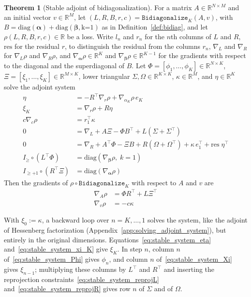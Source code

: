 \documentclass[a4paper,12pt]{article}
\theoremstyle{definition}
\newtheorem{theorem}{Theorem}
\begin{document}
\begin{theorem}[Stable adjoint of bidiagonalization]\label{thm:stable_adjoint}
For a matrix $A \in \mathbb{R}^{N \times M}$ and an initial vector $v \in \mathbb{R}^M$, let $(L, R, B, r, c) = \texttt{Bidiagonalize}_K(A, v)$, with $B = \text{diag}(\boldsymbol{\alpha}) + \text{diag}(\boldsymbol{\beta}, \text{k=1})$ as in Definition~\ref{def:bidiag}, and let $\rho(L, R, B, r, c) \in \mathbb{R}$ be a loss. Write $l_n$ and $r_n$ for the $n$th columns of $L$ and $R$, $\text{res}$ for the residual $r$, to distinguish the residual from the columns $r_n$, $\nabla_L$ and $\nabla_R$ for $\nabla_L \rho$ and $\nabla_R \rho$, and $\nabla_{\boldsymbol{\alpha}}\rho \in \mathbb{R}^K$ and $\nabla_{\boldsymbol{\beta}}\rho \in \mathbb{R}^{K-1}$ for the gradients with respect to the diagonal and the superdiagonal of $B$. Let $\Phi = [\phi_1, \dots, \phi_K] \in \mathbb{R}^{N \times K}$, $\Xi = [\xi_1, \dots, \xi_K] \in \mathbb{R}^{M \times K}$, lower triangular $\Sigma, \Omega \in \mathbb{R}^{K \times K}$, $\kappa \in \mathbb{R}^M$, and $\eta \in \mathbb{R}^K$ solve the adjoint system
\begin{align}
    \eta &= -R^\top \nabla_r \rho + \nabla_{\alpha_K}\rho\, e_K \label{eq:stable_system_eta}
    \\
    \xi_K &= \nabla_r \rho + R\eta \label{eq:stable_system_xi_K}
    \\
    c\nabla_c\rho &= r_1^\top \kappa \label{eq:stable_system_c}
    \\
    0 &= \nabla_L + A\Xi - \Phi B^\top + L(\Sigma + \Sigma^\top) \label{eq:stable_system_Phi}
    \\
    0 &= \nabla_R + A^\top\!\Phi - \Xi B + R(\Omega + \Omega^\top) + \kappa\, e_1^\top + \text{res}\;\eta^\top \label{eq:stable_system_Xi}
    \\
    I_{\geq} \circ (L^\top \Phi) &= \text{diag}(\nabla_{\boldsymbol{\beta}}\rho,\; k\!=\!1) \label{eq:stable_system_reprojL}
    \\
    I_{\geq+1} \circ (R^\top \Xi) &= \text{diag}(\nabla_{\boldsymbol{\alpha}}\rho) \label{eq:stable_system_reprojR}
\end{align}
Then the gradients of $\rho \circ \texttt{Bidiagonalize}_K$ with respect to $A$ and $v$ are
\begin{align}
    \nabla_A\rho &= \Phi R^\top + L\Xi^\top \label{eq:stable_system_grad_A}
    \\
    \nabla_v\rho &= -c\kappa \label{eq:stable_system_grad_v}
\end{align}
\end{theorem}
With $\xi_0 := \kappa$, a backward loop over $n = K, \dots, 1$ solves the system, like the adjoint of Hessenberg factorization (Appendix~\ref{app:solving_adjoint_system}), but entirely in the original dimensions. Equations~\eqref{eq:stable_system_eta} and~\eqref{eq:stable_system_xi_K} give $\xi_K$. In step $n$, column $n$ of~\eqref{eq:stable_system_Phi} gives $\phi_n$, and column $n$ of~\eqref{eq:stable_system_Xi} gives $\xi_{n-1}$; multiplying these columns by $L^\top$ and $R^\top$ and inserting the reprojection constraints~\eqref{eq:stable_system_reprojL} and~\eqref{eq:stable_system_reprojR} gives row $n$ of $\Sigma$ and of $\Omega$.
\end{document}
